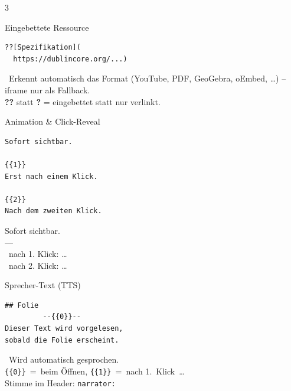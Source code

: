 \documentclass[a4paper,landscape,9pt]{extarticle}
\newcommand{\prevsm}[1]{{\footnotesize\color{muted} #1}}
\begin{document}
\begin{multicols}{3}
\begin{liacard}{Eingebettete Ressource}
\begin{lstlisting}[language=lia]
??[Spezifikation](
  https://dublincore.org/...)
\end{lstlisting}
\tcblower
\prevsm{\faWindowMaximize~Erkennt automatisch
das Format (YouTube, PDF, GeoGebra,
oEmbed, \dots) -- iframe nur als
Fallback.\\[2pt]
\textbf{??} statt \textbf{?} = eingebettet
statt nur verlinkt.}
\end{liacard}

\begin{liacard}{Animation \& Click-Reveal}
\begin{lstlisting}[language=lia]
Sofort sichtbar.

{{1}}
Erst nach einem Klick.

{{2}}
Nach dem zweiten Klick.
\end{lstlisting}
\tcblower
\prevsm{Sofort sichtbar.\\
{\color{rulegray}---}\\
\faMousePointer~nach 1. Klick: \textit{\dots}\\
\faMousePointer~nach 2. Klick: \textit{\dots}}
\end{liacard}

\begin{liacard}{Sprecher-Text (TTS)}
\begin{lstlisting}[language=lia]
## Folie
         --{{0}}--
Dieser Text wird vorgelesen,
sobald die Folie erscheint.
\end{lstlisting}
\tcblower
\prevsm{\faVolumeUp~Wird automatisch
gesprochen.\\
\texttt{\{\{0\}\}}~=~beim Öffnen,
\texttt{\{\{1\}\}}~=~nach 1.~Klick~\dots\\[2pt]
{\footnotesize Stimme im Header: \texttt{narrator:}}}
\end{liacard}



\end{multicols}
\end{document}
